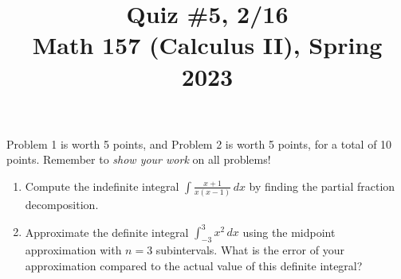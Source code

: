 \documentclass[11pt]{article}
\title{Quiz \#5, 2/16 \\ Math 157 (Calculus II), Spring 2023}
\date{}
\begin{document}
\maketitle

\thispagestyle{empty}

\vspace{-2cm}

Problem 1 is worth 5 points, and Problem 2 is worth 5 points, for a total of 10 points. Remember to \emph{show your work} on all problems!

\begin{enumerate}
\item Compute the indefinite integral $\displaystyle \int \frac{x+1}{x(x-1)} \, dx$ by finding the partial fraction decomposition.

\vspace{7.5cm}

\item Approximate the definite integral $\displaystyle \int_{-3}^{3} x^2 \, dx$ using the midpoint approximation with $n=3$ subintervals. What is the error of your approximation compared to the actual value of this definite integral?

\end{enumerate}
\end{document}
